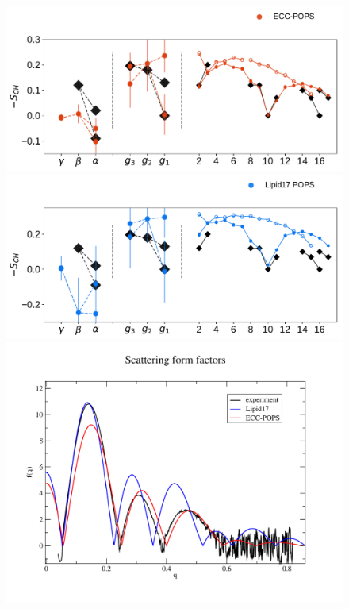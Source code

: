 \begin{figure}[tb!] 
  \centering 
  \includegraphics[width=\figwidth]{../img/ecc_pops/order_parameters_actual_pure-POPS.pdf} 
  \includegraphics[width=\figwidth]{../img/ecc_pops/l17/order_parameters_actual_pure-POPS.pdf} 
  \includegraphics[width=\figwidth]{../img/ecc_pops/form-f_l17-ecc-pops-exp_compar.pdf} 

\end{figure}
